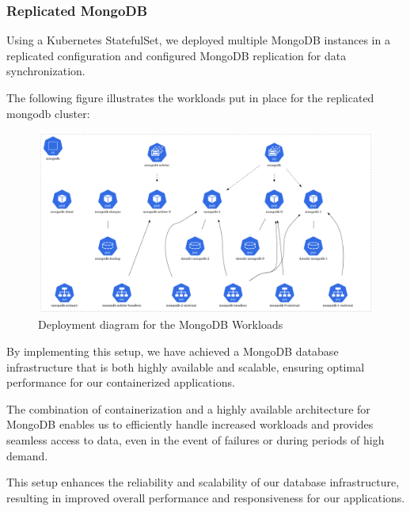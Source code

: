 \subsubsection{Replicated MongoDB }

\hspace{7mm}Using a Kubernetes StatefulSet, we deployed multiple MongoDB instances in a replicated configuration and configured MongoDB replication for data synchronization.

\hspace{7mm}The following figure illustrates the workloads put in place for the replicated mongodb cluster: 


\begin{figure}[H]\centering
\includegraphics[width=1.0\textwidth,angle=00]{assets/f36.png}
\caption{Deployment diagram for the MongoDB Workloads }
\label{fig:MongoDB Workloads}
\end{figure}

\hspace{7mm}By implementing this setup, we have achieved a MongoDB database infrastructure that is both highly available and scalable, ensuring optimal performance for our containerized applications.

\hspace{7mm}The combination of containerization and a highly available architecture for MongoDB enables us to efficiently handle increased workloads and provides seamless access to data, even in the event of failures or during periods of high demand.

\hspace{7mm}This setup enhances the reliability and scalability of our database infrastructure, resulting in improved overall performance and responsiveness for our applications.

\newpage

